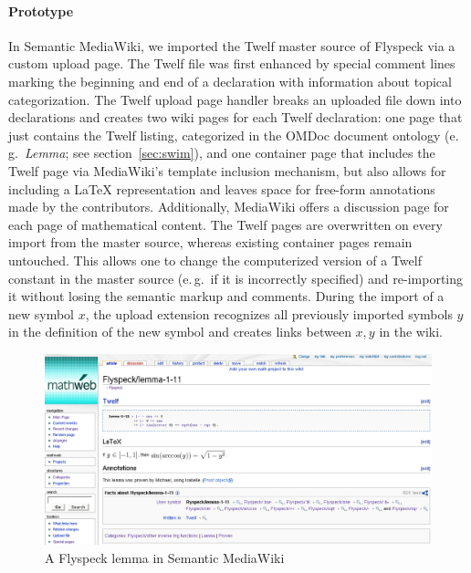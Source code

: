 \paragraph{Prototype} In Semantic MediaWiki, we imported the Twelf master source
of Flyspeck via a custom upload page.  The Twelf file was first
enhanced by special comment lines marking the beginning and end of a
declaration with information about topical categorization.  The Twelf
upload page handler breaks an uploaded file down into declarations and
creates two wiki pages for each Twelf declaration: one page that just
contains the Twelf listing, categorized in the OMDoc document ontology
(e.\,g.\ \textit{Lemma}; see section~\ref{sec:swim}), and one
container page that includes the Twelf page via MediaWiki's template
inclusion mechanism, but also allows for including a {\LaTeX}
representation and leaves space for free-form annotations made by the
contributors.  Additionally, MediaWiki offers a discussion page for
each page of mathematical content.  The Twelf pages are overwritten on
every import from the master source, whereas existing container pages
remain untouched.  This allows one to change the computerized version
of a Twelf constant in the master source (e.\,g.\ if it is incorrectly
specified) and re-importing it without losing the semantic markup and
comments.  During the import of a new symbol $x$, the upload extension
recognizes all previously imported symbols $y$ in the definition of
the new symbol and creates links between $x,y$ in the wiki.

\begin{figure}
  \centering
  \includegraphics[width=\textwidth]{images/smw-lemma}
  \caption[A Flyspeck lemma in Semantic MediaWiki]{A Flyspeck lemma in Semantic
    MediaWiki\protect\footnotemark}
  \label{fig:smw-lemma}
\end{figure}
\addtocounter{footnote}{-1}

